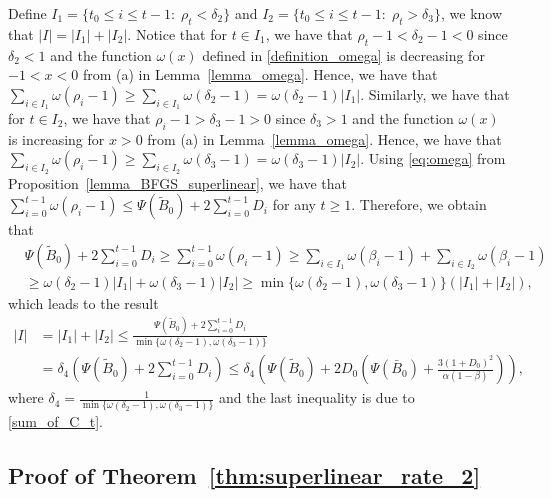 \documentclass[11pt,letterpaper]{article}
\newcommand\0{{\Vector{0}}}
\newcommand\1{{\Vector{1}}}
\numberwithin{assumption}{section}
\numberwithin{definition}{section}
\numberwithin{theorem}{section}
\numberwithin{remark}{section}
\begin{document}
Define $I_1  = \{t_0 \leq i \leq t - 1:\; \rho_t < \delta_2\}$ and $I_2  = \{t_0 \leq i \leq t - 1:\; \rho_t > \delta_3\}$, we know that $|I| = |I_1| + |I_2|$. Notice that for $t \in I_1$, we have that $\rho_t - 1 < \delta_2 - 1 < 0$ since $\delta_2 < 1$ and the function $\omega(x)$ defined in \eqref{definition_omega} is decreasing for $-1 < x < 0$ from (a) in Lemma~\ref{lemma_omega}. Hence, we have that $ \sum_{i \in I_1}\omega(\rho_i - 1) \geq  \sum_{i \in I_1}\omega(\delta_2 - 1) = \omega(\delta_2 - 1)|I_1|$. Similarly, we have that for $t \in I_2$, we have that $\rho_i - 1 > \delta_3 - 1 > 0$ since $\delta_3 > 1$ and the function $\omega(x)$ is increasing for $x > 0$ from (a) in Lemma~\ref{lemma_omega}. Hence, we have that $ \sum_{i \in I_2}\omega(\rho_i - 1) \geq \sum_{i \in I_2}\omega(\delta_3 - 1) = \omega(\delta_3 - 1)|I_2|$. Using \eqref{eq:omega} from Proposition~\ref{lemma_BFGS_superlinear}, we have that $\sum_{i = 0}^{t - 1} \omega(\rho_i - 1) \leq \Psi(\tilde{B}_{0}) + 2\sum_{i = 0}^{t  - 1}D_i$ for any $t \geq 1$. Therefore, we obtain that
    \begin{align*}
        & \Psi(\tilde{B}_{0}) + 2\sum_{i = 0}^{t - 1}D_i \geq \sum_{i = 0}^{t - 1} \omega(\rho_i - 1) \geq \sum_{i \in I_1}\omega(\beta_i - 1) + \sum_{i \in I_2}\omega(\beta_i - 1) \\
        & \geq \omega(\delta_2 - 1)|I_1| + \omega(\delta_3 - 1)|I_2|  \geq \min\{\omega(\delta_2 - 1), \omega(\delta_3 - 1)\}(|I_1| + |I_2|),
    \end{align*}
    which leads to the result
    \begin{equation}\label{lem:bad_set_proof_1}
    \begin{split}
        |I| & = |I_1| + |I_2| \leq \frac{\Psi(\tilde{B}_{0}) + 2\sum_{i = 0}^{t - 1}D_i}{\min\{\omega(\delta_2 - 1), \omega(\delta_3 - 1)\}} \\
        & = \delta_4 \left(\Psi(\tilde{B}_{0}) + 2\sum_{i = 0}^{t - 1}D_i\right) \leq \delta_4 \left(\Psi(\tilde{B}_{0}) + 2D_0(\Psi(\bar{B}_{0}) + \frac{3(1 + D_0)^2}{\alpha(1 - \beta)})\right),
    \end{split}
    \end{equation}
    where $\delta_4 = \frac{1}{\min\{\omega(\delta_2 - 1), \omega(\delta_3 - 1)\}}$ and the last inequality is due to \eqref{sum_of_C_t}.

\subsection{Proof of Theorem~\ref{thm:superlinear_rate_2}}\label{proof_thm:superlinear_rate_2}
\end{document}
